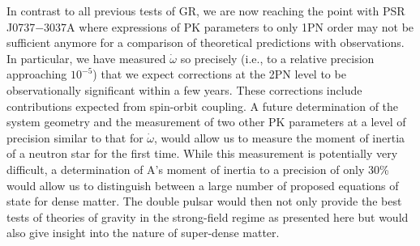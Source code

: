 \documentclass[12pt,psfig]{article}
\begin{document}
In contrast to all previous tests of GR, we are now reaching the point with
PSR J0737$-$3037A where expressions of PK parameters to only 1PN order may not
be sufficient anymore for a comparison of theoretical predictions with
observations.  In particular, we have measured $\dot\omega$ so precisely
(i.e., to a relative precision approaching $10^{-5}$) that we expect
corrections at the 2PN level\cite{ds88} to be observationally significant
within a few years. These corrections include contributions expected from
spin-orbit coupling\cite{dr74,bo75}.  A future determination of the system
geometry and the measurement of two other PK parameters at a level of
precision similar to that for $\dot\omega$, would allow us to measure the
moment of inertia of a neutron star for the first time\cite{ds88,wex95}.
While this measurement is potentially very difficult, a determination of A's
moment of inertia to a precision of only 30\% would allow us to distinguish
between a large number of proposed equations of state for dense
matter\cite{mbsp04,ls05}. The double pulsar would then not only provide the
best tests of theories of gravity in the strong-field regime as presented here
but would also give insight into the nature of super-dense matter.




%
%
\end{document}
